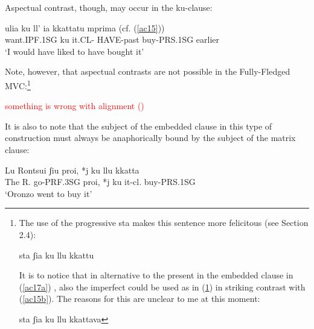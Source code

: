 \documentclass[output=paper]{langscibook}
\newcounter{lasttmp}    %
\newcommand{\Last}{\setcounter{lasttmp}{\value{equation}}(\thelasttmp)\xspace}
\begin{document}
Aspectual contrast, though, may occur in the ku-clause:

\ea \label{ac16}\gll ulia         ku  ll’   ia    kkattatu     mprima  (cf. (\ref{ac15}))\\
  want.IPF.1SG ku  it.CL- HAVE-past buy-PRS.1SG earlier\\
 \glt ‘I would have liked to have bought it’
\z

Note, however, that aspectual contrasts are not possible in the Fully-Fledged MVC:\footnote{The use of the progressive sta makes this sentence more felicitous (see Section 2.4):

\ea \label{fn7ex} {sta ʃia ku llu kkattu}
\z

It is to notice that in alternative to the present in the embedded clause in (\ref{ac17a}) , also the imperfect could be used as in (\ref{fn7ex2}) in striking contrast with (\ref{ac15b}). The reasons for this are unclear to me at this moment:

\ea \label{fn7ex2}{sta ʃia ku llu kkattava}
\z
}

\ea\label{ac17}
    \z
\z 

\textcolor{red}{something is wrong with alignment \Last}

It is also to note that the subject of the embedded clause in this type of construction must always be anaphorically bound by the subject of the matrix clause:

\ea \label{ac18}\gll Lu Rontsui   ʃiu        proi, *j  ku  llu    kkatta\\
  The R.     go-PRF.3SG  proi, *j  ku  it-cl.  buy-PRS.1SG  \\
  \glt ‘Oronzo went to buy it’
\z
\end{document}
